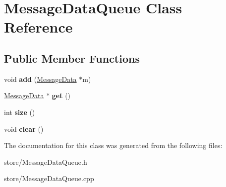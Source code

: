 \hypertarget{classMessageDataQueue}{}\section{Message\+Data\+Queue Class Reference}
\label{classMessageDataQueue}
\subsection*{Public Member Functions}
\begin{DoxyCompactItemize}
\item 
void {\bfseries add} (\hyperlink{classMessageData}{Message\+Data} $\ast$m)\hypertarget{classMessageDataQueue_aa31f6a8bed7000525d09716de264a049}{}\label{classMessageDataQueue_aa31f6a8bed7000525d09716de264a049}

\item 
\hyperlink{classMessageData}{Message\+Data} $\ast$ {\bfseries get} ()\hypertarget{classMessageDataQueue_ace0bab37a7339c7a0eb813f80a03c88d}{}\label{classMessageDataQueue_ace0bab37a7339c7a0eb813f80a03c88d}

\item 
int {\bfseries size} ()\hypertarget{classMessageDataQueue_a6f7619c03371e76b95a2c2d348da866d}{}\label{classMessageDataQueue_a6f7619c03371e76b95a2c2d348da866d}

\item 
void {\bfseries clear} ()\hypertarget{classMessageDataQueue_a565232895a0e0cc0416715aedf2e5e21}{}\label{classMessageDataQueue_a565232895a0e0cc0416715aedf2e5e21}

\end{DoxyCompactItemize}


The documentation for this class was generated from the following files\+:\begin{DoxyCompactItemize}
\item 
store/Message\+Data\+Queue.\+h\item 
store/Message\+Data\+Queue.\+cpp\end{DoxyCompactItemize}
